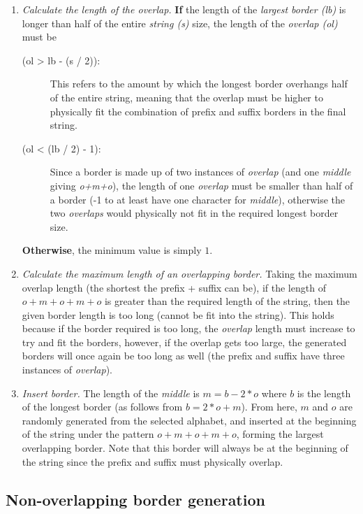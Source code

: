 \documentclass{l4proj}
\begin{document}
\begin{enumerate}[i]
	\item
	\emph{Calculate the length of the overlap.} \textbf{If} the length of the \emph{largest border (lb)} is longer than half of the entire \emph{string (s)} size, the length of the \emph{overlap (ol)} must be
	\begin{description}
		\item[(ol > lb - (s / 2)):]
		This refers to the amount by which the longest border overhangs half of the entire string, meaning that the overlap must be higher to physically fit the combination of prefix and suffix borders in the final string.
		\item[(ol < (lb / 2) - 1):] Since a border is made up of two instances of \emph{overlap} (and one \emph{middle} giving \emph{o+m+o}), the length of one \emph{overlap} must be smaller than half of a border (-1 to at least have one character for \emph{middle}), otherwise the two \emph{overlaps} would physically not fit in the required longest border size.
	\end{description}
\textbf{Otherwise}, the minimum value is simply $1$. 

	\item
	 \emph{Calculate the maximum length of an overlapping border.} Taking the maximum overlap length (the shortest the prefix + suffix can be), if the length of $o+m+o+m+o$ is greater than the required length of the string, then the given border length is too long (cannot be fit into the string). This holds because if the border required is too long, the \emph{overlap} length must increase to try and fit the borders, however, if the overlap gets too large, the generated borders will once again be too long as well (the prefix and suffix have three instances of \emph{overlap}).

\item
\emph{Insert border.} The length of the \emph{middle} is $m = b - 2 * o$ where $b$ is the length of the longest border (as follows from $b = 2 * o + m$). From here, $m$ and $o$ are randomly generated from the selected alphabet, and inserted at the beginning of the string under the pattern $o+m+o+m+o$, forming the largest overlapping border. Note that this border will always be at the beginning of the string since the prefix and suffix must physically overlap.
\end{enumerate}

\subsection{Non-overlapping border generation}
\label{sec:nob}
\end{document}
